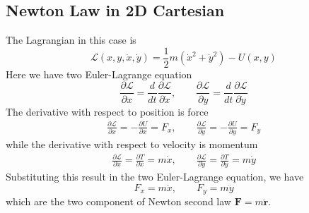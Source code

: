 \documentclass[../../../main.tex]{subfiles}
\begin{document}
\subsection*{Newton Law in 2D Cartesian}
The Lagrangian in this case is 
\begin{equation*}
  \mathcal{L}(x,y,\dot{x},\dot{y})=\frac{1}{2}m(\dot{x}^2+\dot{y}^2)-U(x,y)
\end{equation*}
Here we have two Euler-Lagrange equation
\begin{equation*}
  \frac{\partial \mathcal{L}}{\partial x}=\frac{d}{dt}\frac{\partial \mathcal{L}}{\partial \dot{x}},\qquad
  \frac{\partial \mathcal{L}}{\partial y}=\frac{d}{dt}\frac{\partial \mathcal{L}}{\partial \dot{y}}
\end{equation*}
The derivative with respect to position is force
\begin{align*}
  \frac{\partial \mathcal{L}}{\partial x}=-\frac{\partial U}{\partial x}=F_x,\qquad
  \frac{\partial \mathcal{L}}{\partial y}=-\frac{\partial U}{\partial y}=F_y
\end{align*}
while the derivative with respect to velocity is momentum
\begin{align*}
  \frac{\partial\mathcal{L}}{\partial \dot{x}}=\frac{\partial T}{\partial \dot{x}}=m\dot{x}, \qquad
  \frac{\partial\mathcal{L}}{\partial \dot{y}}=\frac{\partial T}{\partial \dot{y}}=m\dot{y}
\end{align*}
Substituting this result in the two Euler-Lagrange equation, we have 
\begin{equation*}
  F_x=m\ddot{x},\qquad F_y=m\ddot{y}
\end{equation*}
which are the two component of Newton second law $\mathbf{F}=m\mathbf{\ddot{r}}$.
\end{document}
